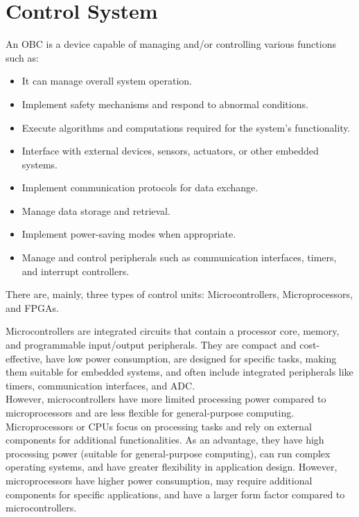 
\section{Control System}
An \gls{OBC} is a device capable of managing and/or controlling various functions such as:
\begin{itemize}
    \item It can manage overall system operation.
    \item Implement safety mechanisms and respond to abnormal conditions.
    \item Execute algorithms and computations required for the system's functionality.
    \item Interface with external devices, sensors, actuators, or other embedded systems.
    \item Implement communication protocols for data exchange.
    \item Manage data storage and retrieval.
    \item Implement power-saving modes when appropriate.
    \item Manage and control peripherals such as communication interfaces, timers, and interrupt controllers.
\end{itemize}

There are, mainly, three types of control units: Microcontrollers, Microprocessors, and \glspl{FPGA}.

Microcontrollers are integrated circuits that contain a processor core, memory, and programmable input/output peripherals.
They are compact and cost-effective, have low power consumption, are designed for specific tasks, making them suitable for embedded systems, and often include integrated peripherals like timers, communication interfaces, and ADC.\\
However, microcontrollers have more limited processing power compared to microprocessors and are less flexible for general-purpose computing.\\

Microprocessors or \glspl{CPU} focus on processing tasks and rely on external components for additional functionalities.
As an advantage, they have high processing power (suitable for general-purpose computing), can run complex operating systems, and have greater flexibility in application design.
However, microprocessors have higher power consumption, may require additional components for specific applications, and have a larger form factor compared to microcontrollers.\\

